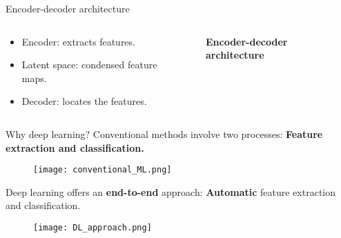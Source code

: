 \documentclass[10pt,aspectratio=169,dvipsnames]{beamer} %
\begin{document}
	\begin{frame}{Encoder-decoder architecture}
		\begin{columns}[T]
			\begin{column}[c]{.40\textwidth}
				\justifying
				\begin{itemize}
					\item \alert{Encoder}: extracts features.
					\item \alert{Latent space}: condensed feature maps.
					\item \alert{Decoder}: locates the features.
				\end{itemize}	
			\end{column}
			\begin{column}[c]{.6\textwidth}
				\begin{figure}
					\centering
					\caption{\textbf{Encoder-decoder architecture}}
				\end{figure}	
			\end{column}
		\end{columns}			
	\end{frame}
	\setcounter{subfigure}{0}
	\begin{frame}{Why deep learning?}
		Conventional methods involve two processes:
		\alert{\textbf{Feature extraction and classification.}}
		\begin{figure}
			\centering
			\texttt{[image: conventional\_ML.png]}
		\end{figure}	
		Deep learning offers an \alert{\textbf{end-to-end}} approach: \alert{\textbf{Automatic}} feature extraction and classification.
		\begin{figure}
			\texttt{[image: DL\_approach.png]}
		\end{figure}
	\end{frame}
\end{document}
